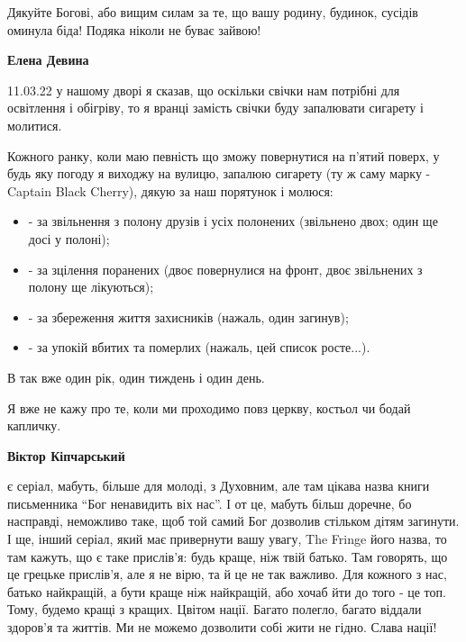  
 
 
 
 

\qqSecCmt


Дякуйте Богові, або вищим силам за те, що вашу родину, будинок, сусідів оминула
біда! Подяка ніколи не буває зайвою!

\begin{itemize} %
\textbf{Елена Девина} 

11.03.22 у нашому дворі я сказав, що оскільки свічки нам потрібні для
освітлення і обігріву, то я вранці замість свічки буду запалювати сигарету і
молитися.

Кожного ранку, коли маю певність що зможу повернутися на п'ятий поверх, у будь
яку погоду я виходжу на вулицю, запалюю сигарету (ту ж саму марку - Captain
Black Cherry), дякую за наш порятунок і молюся:

\begin{itemize}
  \item - за звільнення з полону друзів і усіх полонених (звільнено двох; один ще досі у полоні);
  \item - за зцілення поранених (двоє повернулися на фронт, двоє звільнених з полону ще лікуються);
  \item - за збереження життя захисників (нажаль, один загинув);
  \item - за упокій вбитих та померлих (нажаль, цей список росте...).
\end{itemize}

В так вже один рік, один тиждень і один день.

Я вже не кажу про те, коли ми проходимо повз церкву, костьол чи бодай капличку.

\textbf{Віктор Кіпчарський} 

є серіал, мабуть, більше для молоді, з Духовним, але там цікава назва книги
письменника \enquote{Бог ненавидить віх нас}. І от це, мабуть більш доречне, бо
насправді, неможливо таке, щоб той самий Бог дозволив стільком дітям загинути.
І ще, інший серіал, який має привернути вашу увагу, The Fringe його назва, то
там кажуть, що є таке прислів'я: будь краще, ніж твій батько. Там говорять, що
це грецьке прислів'я, але я не вірю, та й це не так важливо. Для кожного з нас,
батько найкращій, а бути краще ніж найкращій, або хочаб йти до того - це топ.
Тому, будемо кращі з кращих. Цвітом нації. Багато полегло, багато віддали
здоров'я та життів. Ми не можемо дозволити собі жити не гідно. Слава нації!


\end{itemize}
